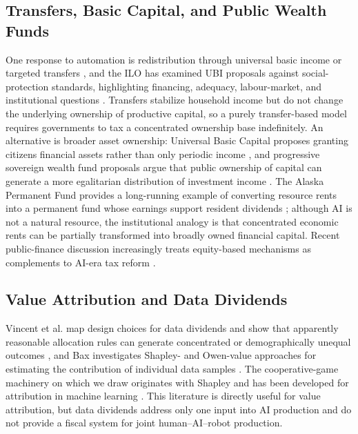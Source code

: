 \documentclass[journal]{IEEEtran}
\theoremstyle{plain}
\theoremstyle{definition}
\begin{document}
\subsection{Transfers, Basic Capital, and Public Wealth Funds}

One response to automation is redistribution through universal basic income or targeted transfers \cite{Merola2022,VanParijs2017}, and the ILO has examined UBI proposals against social-protection standards, highlighting financing, adequacy, labour-market, and institutional questions \cite{ILOUBI}. Transfers stabilize household income but do not change the underlying ownership of productive capital, so a purely transfer-based model requires governments to tax a concentrated ownership base indefinitely. An alternative is broader asset ownership: Universal Basic Capital proposes granting citizens financial assets rather than only periodic income \cite{LeGrand2020}, and progressive sovereign wealth fund proposals argue that public ownership of capital can generate a more egalitarian distribution of investment income \cite{Corneo2022,Piketty2014}. The Alaska Permanent Fund provides a long-running example of converting resource rents into a permanent fund whose earnings support resident dividends \cite{APF}; although AI is not a natural resource, the institutional analogy is that concentrated economic rents can be partially transformed into broadly owned financial capital. Recent public-finance discussion increasingly treats equity-based mechanisms as complements to AI-era tax reform \cite{BrookingsTax2026,BrookingsFairness2026}.

\subsection{Value Attribution and Data Dividends}

Vincent et al. map design choices for data dividends and show that apparently reasonable allocation rules can generate concentrated or demographically unequal outcomes \cite{Vincent2019}, and Bax investigates Shapley- and Owen-value approaches for estimating the contribution of individual data samples \cite{Bax2019}. The cooperative-game machinery on which we draw originates with Shapley \cite{Shapley1953} and has been developed for attribution in machine learning \cite{LundbergLee2017,GhorbaniZou2019,Jia2019}. This literature is directly useful for value attribution, but data dividends address only one input into AI production and do not provide a fiscal system for joint human--AI--robot production.
\end{document}
